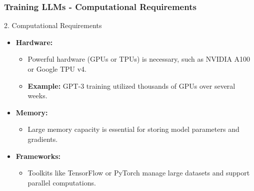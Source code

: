 \documentclass[aspectratio=169]{beamer}
\begin{document}
\begin{frame}[fragile]
    \frametitle{Training LLMs - Computational Requirements}
    \begin{block}{2. Computational Requirements}
        \begin{itemize}
            \item \textbf{Hardware:} 
                \begin{itemize}
                    \item Powerful hardware (GPUs or TPUs) is necessary, such as NVIDIA A100 or Google TPU v4.
                    \item \textbf{Example:} GPT-3 training utilized thousands of GPUs over several weeks.
                \end{itemize}
            \item \textbf{Memory:} 
                \begin{itemize}
                    \item Large memory capacity is essential for storing model parameters and gradients.
                \end{itemize}
            \item \textbf{Frameworks:}
                \begin{itemize}
                    \item Toolkits like TensorFlow or PyTorch manage large datasets and support parallel computations.
                \end{itemize}
        \end{itemize}
    \end{block}
\end{frame}
\end{document}
